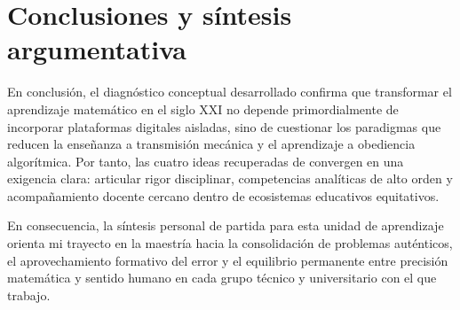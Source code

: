 \documentclass[spanish,letterpaper,oneside]{article}
\begin{document}
\clearpage
\section{Conclusiones y síntesis argumentativa}
En conclusión, el diagnóstico conceptual desarrollado confirma que transformar el aprendizaje matemático en el siglo XXI no depende primordialmente de incorporar plataformas digitales aisladas, sino de cuestionar los paradigmas que reducen la enseñanza a transmisión mecánica y el aprendizaje a obediencia algorítmica. Por tanto, las cuatro ideas recuperadas de \citet{scott2015futuro} convergen en una exigencia clara: articular rigor disciplinar, competencias analíticas de alto orden y acompañamiento docente cercano dentro de ecosistemas educativos equitativos.

En consecuencia, la síntesis personal de partida para esta unidad de aprendizaje orienta mi trayecto en la maestría hacia la consolidación de problemas auténticos, el aprovechamiento formativo del error y el equilibrio permanente entre precisión matemática y sentido humano en cada grupo técnico y universitario con el que trabajo.
\end{document}

